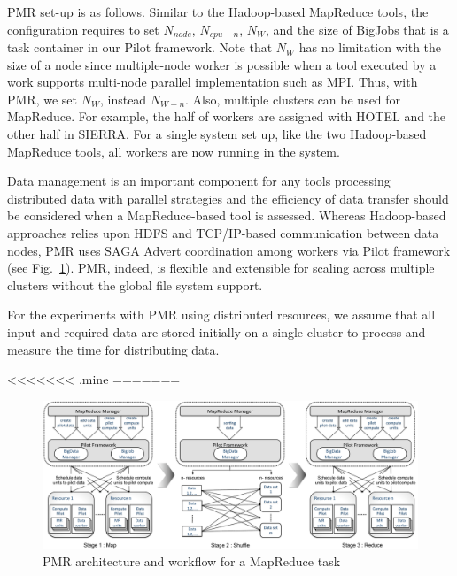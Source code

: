 \documentclass{sig-alternate}
\begin{document}
PMR set-up is as follows.  Similar to the Hadoop-based MapReduce tools, the configuration requires to set $N_{node}$, $N_{cpu-n}$, $N_W$, and the size of BigJobs that is a task container in our Pilot framework\cite{pmr2012,saga_bigjob_condor_cloud,pstar11}.  Note that $N_W$ has no limitation with the size of a node since multiple-node worker is possible when a tool executed by a work supports multi-node parallel implementation such as MPI.  Thus, with PMR, we set $N_W$, instead $N_{W-n}$.  Also, multiple clusters can be used for MapReduce. For example, the half of workers are assigned with HOTEL and the other half in SIERRA.  For a single system set up, like the two Hadoop-based MapReduce tools, all workers are now running in the system.  

Data management is an important component for any tools processing distributed data with parallel strategies and the efficiency of data transfer should be considered when a MapReduce-based tool is assessed.  Whereas Hadoop-based approaches relies upon HDFS and TCP/IP-based communication between data nodes, PMR uses SAGA Advert coordination among workers via Pilot framework (see Fig.~\ref{fig:arch-pj-saga-mr}).  PMR, indeed, is flexible and extensible for scaling across multiple clusters without the global file system support.  
 
 
For the experiments with PMR using distributed resources, we assume that all input and required data are stored initially on a single cluster to process and measure the time for distributing data.  


<<<<<<< .mine
=======


\begin{figure}
 \centering
\includegraphics[scale=0.3]{figures/F1_1.pdf} 
\caption{\small PMR architecture and workflow for a MapReduce task}
  \label{fig:arch-pj-saga-mr} 
\end{figure}
\end{document}
